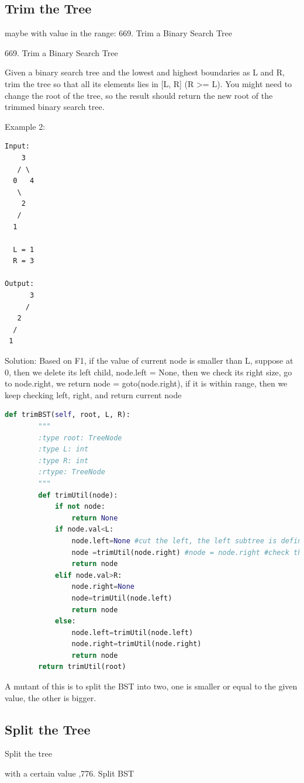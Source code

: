 \documentclass[../main.tex]{subfiles}
\begin{document}
\subsection{Trim the Tree}
maybe with value in the range: 669. Trim a Binary Search Tree

669. Trim a Binary Search Tree

Given a binary search tree and the lowest and highest boundaries as L and R, trim the tree so that all its elements lies in [L, R] (R >= L). You might need to change the root of the tree, so the result should return the new root of the trimmed binary search tree.

Example 2:
\begin{lstlisting}
Input: 
    3
   / \
  0   4
   \
    2
   /
  1

  L = 1
  R = 3

Output: 
      3
     / 
   2   
  /
 1
 \end{lstlisting}

Solution: Based on F1, if the value of current node is smaller than L, suppose at 0, then we delete its left child, node.left = None, then we check its right size, go to node.right, we return node = goto(node.right), if it is within range, then we keep checking left, right, and return current node
\begin{lstlisting}[language = Python]
def trimBST(self, root, L, R):
        """
        :type root: TreeNode
        :type L: int
        :type R: int
        :rtype: TreeNode
        """
        def trimUtil(node):
            if not node:
                return None
            if node.val<L:
                node.left=None #cut the left, the left subtree is definitly smaller than L              
                node =trimUtil(node.right) #node = node.right #check the right
                return node
            elif node.val>R:
                node.right=None
                node=trimUtil(node.left)
                return node
            else:
                node.left=trimUtil(node.left)
                node.right=trimUtil(node.right)
                return node       
        return trimUtil(root)
\end{lstlisting}
A mutant of this is to split the BST into two, one is smaller or equal to the given value, the other is bigger.
\subsection{Split the Tree}
Split the tree

with a certain value ,776. Split BST
\end{document}
